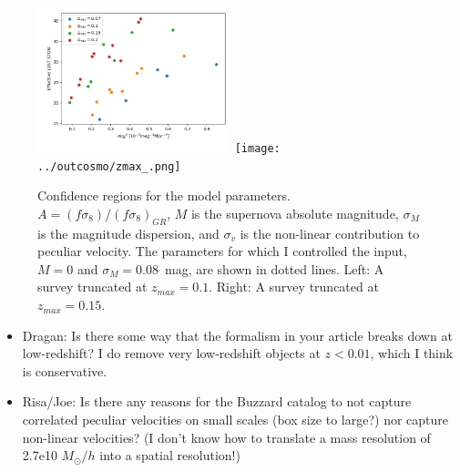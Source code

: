 \documentclass{aastex62}   	%
\begin{document}
\begin{figure}
\includegraphics[width=0.5\textwidth]{../outcosmo/fracsnsig2_.png}
\texttt{[image: ../outcosmo/zmax\_.png]}
\caption{Confidence regions for the model parameters.  $A=(f\sigma_8)/(f\sigma_8)_{GR}$, $M$ is the supernova
absolute magnitude, $\sigma_M$ is the magnitude dispersion, and $\sigma_v$ is the non-linear contribution
to peculiar velocity.   The parameters for which I controlled the input, $M=0$ and $\sigma_M=0.08$~mag, are shown in dotted lines.
 Left: A survey truncated at $z_{max}=0.1$.  Right: A survey truncated at $z_{max}=0.15$.
\label{zmax:fig}}
\end{figure}

\begin{itemize}
\item Dragan: Is there some way that the formalism in your article breaks down at low-redshift?  I do remove very low-redshift objects at $z<0.01$,
which I think is conservative.
 \item Risa/Joe: Is there any reasons for the Buzzard catalog to not capture correlated peculiar velocities on small scales (box size to large?) nor capture
 non-linear velocities?  (I don't know how to translate a mass resolution of 2.7e10 $M_{\odot}/h$ into a spatial resolution!)
\end{itemize}



\end{document}
